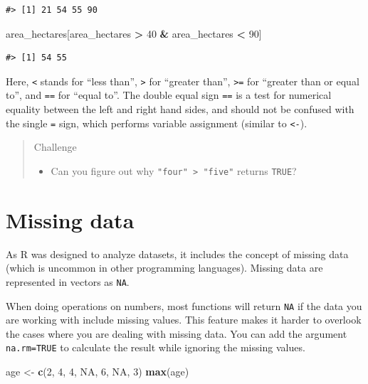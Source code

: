 \documentclass[
]{book}
\newenvironment{Shaded}{\begin{snugshade}}{\end{snugshade}}
\newcommand{\ConstantTok}[1]{\textcolor[rgb]{0.56,0.35,0.01}{#1}}
\newcommand{\DecValTok}[1]{\textcolor[rgb]{0.00,0.00,0.81}{#1}}
\newcommand{\FunctionTok}[1]{\textcolor[rgb]{0.13,0.29,0.53}{\textbf{#1}}}
\newcommand{\NormalTok}[1]{#1}
\newcommand{\OtherTok}[1]{\textcolor[rgb]{0.56,0.35,0.01}{#1}}
\newcommand{\SpecialCharTok}[1]{\textcolor[rgb]{0.81,0.36,0.00}{\textbf{#1}}}
\providecommand{\tightlist}{%
  \setlength{\itemsep}{0pt}\setlength{\parskip}{0pt}}
\begin{document}
\begin{verbatim}
#> [1] 21 54 55 90
\end{verbatim}

\begin{Shaded}
\begin{Highlighting}[]
\NormalTok{area\_hectares[area\_hectares }\SpecialCharTok{\textgreater{}} \DecValTok{40} \SpecialCharTok{\&}\NormalTok{ area\_hectares }\SpecialCharTok{\textless{}} \DecValTok{90}\NormalTok{]}
\end{Highlighting}
\end{Shaded}

\begin{verbatim}
#> [1] 54 55
\end{verbatim}

Here, \texttt{\textless{}} stands for ``less than'', \texttt{\textgreater{}} for ``greater than'', \texttt{\textgreater{}=} for ``greater than
or equal to'', and \texttt{==} for ``equal to''. The double equal sign \texttt{==} is a test for
numerical equality between the left and right hand sides, and should not be
confused with the single \texttt{=} sign, which performs variable assignment (similar
to \texttt{\textless{}-}).

\begin{quote}
Challenge

\begin{itemize}
\tightlist
\item
  Can you figure out why \texttt{"four"\ \textgreater{}\ "five"} returns \texttt{TRUE}?
\end{itemize}
\end{quote}

\hypertarget{missing-data}{%
\section{Missing data}\label{missing-data}}

As R was designed to analyze datasets, it includes the concept of missing data
(which is uncommon in other programming languages). Missing data are represented
in vectors as \texttt{NA}.

When doing operations on numbers, most functions will return \texttt{NA} if the data
you are working with include missing values. This feature
makes it harder to overlook the cases where you are dealing with missing data.
You can add the argument \texttt{na.rm=TRUE} to calculate the result while ignoring
the missing values.

\begin{Shaded}
\begin{Highlighting}[]
\NormalTok{age }\OtherTok{\textless{}{-}} \FunctionTok{c}\NormalTok{(}\DecValTok{2}\NormalTok{, }\DecValTok{4}\NormalTok{, }\DecValTok{4}\NormalTok{, }\ConstantTok{NA}\NormalTok{, }\DecValTok{6}\NormalTok{, }\ConstantTok{NA}\NormalTok{, }\DecValTok{3}\NormalTok{)}
\FunctionTok{max}\NormalTok{(age)}
\end{Highlighting}
\end{Shaded}
\end{document}
